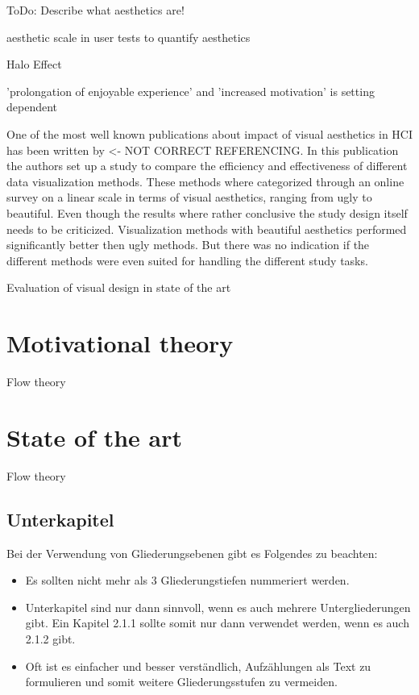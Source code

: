 ToDo: Describe what aesthetics are!

aesthetic scale in user tests to quantify aesthetics

Halo Effect

'prolongation of enjoyable experience' and 'increased motivation' is setting dependent \cite{sonderegger2010influence}

One of the most well known publications about impact of visual aesthetics in \gls{HCI} has been written by  <- NOT CORRECT REFERENCING.
In this publication the authors set up a study to compare the efficiency and effectiveness of different data visualization methods.
These methods where categorized through an online survey on a linear scale in terms of visual aesthetics, ranging from ugly to beautiful.
Even though the results where rather conclusive the study design itself needs to be criticized.
Visualization methods with beautiful aesthetics performed significantly better then ugly methods. 
But there was no indication if the different methods were even suited for handling the different study tasks.

Evaluation of visual design in state of the art

\section{Motivational theory}

Flow theory

\section{State of the art}

Flow theory

\subsection{Unterkapitel}

Bei der Verwendung von Gliederungsebenen gibt es Folgendes zu beachten:
\begin{itemize}
	\item Es sollten nicht mehr als 3 Gliederungstiefen nummeriert werden.
	\item Unterkapitel sind nur dann sinnvoll, wenn es auch mehrere Untergliederungen gibt. Ein Kapitel 2.1.1 sollte somit nur dann verwendet werden, wenn es auch 2.1.2 gibt.
	\item Oft ist es einfacher und besser verständlich, Aufzählungen als Text zu formulieren und somit weitere Gliederungsstufen zu vermeiden.
\end{itemize}

